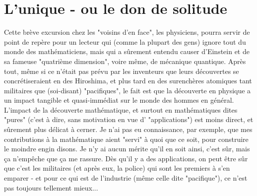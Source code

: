 \section{L'unique - ou le don de solitude}

Cette brève excursion chez les "voisins d'en face", les physiciens, pourra servir de point de repère pour un lecteur qui (comme la plupart des gens) ignore tout du monde des mathématiciens, mais qui a sûrement entendu causer d'Einstein et de sa fameuse "quatrième dimension", voire même, de mécanique quantique. Après tout, même si ce n'était pas prévu par les inventeurs que leurs découvertes se concrétiseraient en des Hiroshima, et plus tard en des surenchères atomiques tant militaires que (soi-disant) "pacifiques", le fait est que la découverte en physique a un impact tangible et quasi-immédiat sur le monde des hommes en général. L'impact de la découverte mathématique, et surtout en mathématiques dites "pures" (c'est à dire, sans motivation en vue d' "applications") est moins direct, et sûrement plus délicat à cerner. Je n'ai pas eu connaissance, par exemple, que mes contributions à la mathématique aient "servi" à quoi que ce soit, pour construire le moindre engin disons. Je n'y ai aucun mérite qu'il en soit ainsi, c'est sûr, mais ça n'empêche que ça me rassure. Dès qu'il y a des applications, on peut être sûr que c'est les militaires (et après eux, la police) qui sont les premiers à s'en emparer - et pour ce qui est de l'industrie (même celle dite "pacifique"), ce n'est pas toujours tellement mieux...

